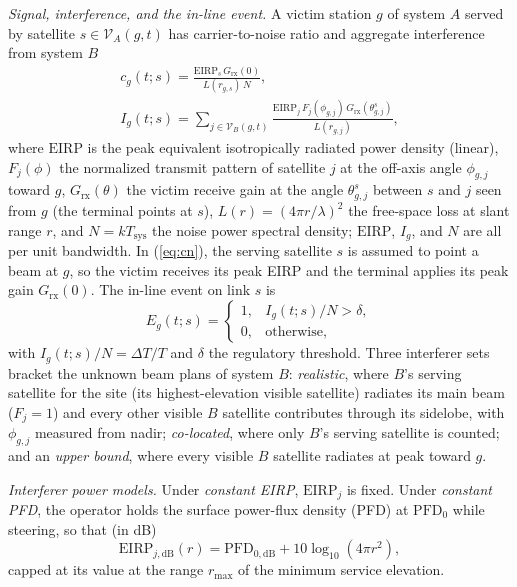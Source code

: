 \documentclass[conference]{IEEEtran}
\begin{document}
\emph{Signal, interference, and the in-line event.} A victim station $g$ of
system $A$ served by satellite $s \in \mathcal{V}_A(g,t)$ has carrier-to-noise
ratio and aggregate interference from system $B$
\begin{gather}
c_g(t;s) = \frac{\mathrm{EIRP}_s\, G_{\text{rx}}(0)}{L(r_{g,s})\,N}, \label{eq:cn}\\
I_g(t;s) = \sum_{j \in \mathcal{V}_B(g,t)} \frac{\mathrm{EIRP}_j\,
F_j(\phi_{g,j})\, G_{\text{rx}}(\theta_{g,j}^{s})}{L(r_{g,j})},
\label{eq:agg}
\end{gather}
where $\mathrm{EIRP}$ is the peak equivalent isotropically radiated power density
(linear), $F_j(\phi)$ the normalized transmit pattern of satellite $j$ at the
off-axis angle $\phi_{g,j}$ toward $g$, $G_{\text{rx}}(\theta)$ the victim
receive gain at the angle $\theta_{g,j}^{s}$ between $s$ and $j$ seen from $g$
(the terminal points at $s$), $L(r)=(4\pi r/\lambda)^2$ the free-space loss at
slant range $r$, and $N = kT_{\text{sys}}$ the noise power spectral density;
$\mathrm{EIRP}$, $I_g$, and $N$ are all per unit bandwidth. In (\ref{eq:cn}), the
serving satellite $s$ is assumed to point a beam at $g$, so the victim receives
its peak EIRP and the terminal applies its peak gain $G_{\text{rx}}(0)$. The
in-line event on link $s$ is
\begin{equation}
E_g(t;s)=
\begin{cases}
1, & I_g(t;s)/N > \delta,\\
0, & \text{otherwise},
\end{cases}
\label{eq:event}
\end{equation}
with $I_g(t;s)/N = \Delta T/T$ and $\delta$ the regulatory threshold. Three interferer sets bracket the unknown
beam plans of system $B$: \emph{realistic}, where $B$'s serving satellite for the
site (its highest-elevation visible satellite) radiates its main beam ($F_j = 1$)
and every other visible $B$ satellite contributes through its sidelobe, with
$\phi_{g,j}$ measured from nadir;
\emph{co-located}, where only $B$'s serving satellite is counted; and an
\emph{upper bound}, where every visible $B$ satellite radiates at peak toward $g$.

\emph{Interferer power models.} Under \emph{constant EIRP}, $\mathrm{EIRP}_j$ is
fixed. Under \emph{constant PFD}, the operator holds the surface power-flux
density (PFD) at $\mathrm{PFD}_0$ while steering, so that (in dB)
\begin{equation}
\mathrm{EIRP}_{j,\text{dB}}(r) = \mathrm{PFD}_{0,\text{dB}} + 10\log_{10}(4\pi r^2),
\label{eq:pfd}
\end{equation}
capped at its value at the range $r_{\max}$ of the minimum service elevation.
\end{document}
